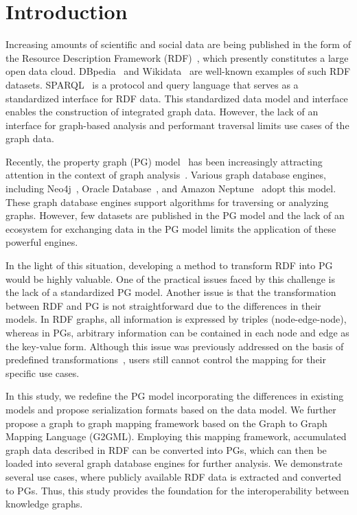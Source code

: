 \documentclass[runningheads]{llncs}
\begin{document}
\section{Introduction}

Increasing amounts of scientific and social data are being published in the form of the Resource Description Framework (RDF)~\cite{rdf}, which presently constitutes a large open data cloud. DBpedia~\cite{dbpedia} and Wikidata~\cite{wikidata} are well-known examples of such RDF datasets. SPARQL~\cite{sparql} is a protocol and query language that serves as a standardized interface for RDF data. This standardized data model and interface enables the construction of integrated graph data. However, the lack of an interface for graph-based analysis and performant traversal limits use cases of the graph data.

Recently, the property graph (PG) model~\cite{angles1,angles2} has been increasingly attracting attention in the context of graph analysis~\cite{agri}. Various graph database engines, including Neo4j~\cite{neo4j}, Oracle Database~\cite{oracle}, and Amazon Neptune~\cite{neptune} adopt this model. These graph database engines support algorithms for traversing or analyzing graphs. However, few datasets are published in the PG model and the lack of an ecosystem for exchanging data in the PG model limits the application of these powerful engines.

In the light of this situation, developing a method to transform RDF into PG would be highly valuable. One of the practical issues faced by this challenge is the lack of a standardized PG model.
Another issue is that the transformation between RDF and PG is not straightforward due to the differences in their models. 
In RDF graphs, all information is expressed by triples (node-edge-node), whereas in PGs, arbitrary information can be contained in each node and edge as the key-value form. 
Although this issue was previously addressed on the basis of predefined transformations~\cite{hartig},
users still cannot control the mapping for their specific use cases.

In this study, we redefine the PG model incorporating the differences in existing models and propose serialization formats based on the data model. We further propose a graph to graph mapping framework based on the Graph to Graph Mapping Language (G2GML). Employing this mapping framework, accumulated graph data described in RDF can be converted into PGs, which can then be loaded into several graph database engines for further analysis. We demonstrate several use cases, where publicly available RDF data is extracted and converted to PGs. Thus, this study provides the foundation for the interoperability between knowledge graphs.
\end{document}
